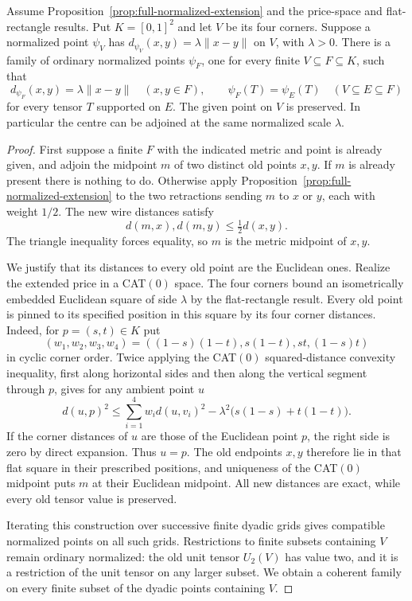 \begin{theorem}
\label{thm:coherent-square-spectrum}
Assume Proposition~\ref{prop:full-normalized-extension} and the price-space and flat-rectangle results.  Put $K=[0,1]^2$ and let $V$ be its four corners.  Suppose a normalized point $\psi_V$ has $d_{\psi_V}(x,y)=\lambda\|x-y\|$ on $V$, with $\lambda>0$.  There is a family of ordinary normalized points $\psi_F$, one for every finite $V\subseteq F\subseteq K$, such that
\[
 d_{\psi_F}(x,y)=\lambda\|x-y\|\quad(x,y\in F),
 \qquad
 \psi_F(T)=\psi_E(T)\quad(V\subseteq E\subseteq F)
\]
for every tensor $T$ supported on $E$.  The given point on $V$ is preserved.  In particular the centre can be adjoined at the same normalized scale $\lambda$.
\end{theorem}
\begin{proof}
First suppose a finite $F$ with the indicated metric and point is already given, and adjoin the midpoint $m$ of two distinct old points $x,y$.  If $m$ is already present there is nothing to do.  Otherwise apply Proposition~\ref{prop:full-normalized-extension} to the two retractions sending $m$ to $x$ or $y$, each with weight $1/2$.  The new wire distances satisfy
\[
 d(m,x),d(m,y)\leq\tfrac12d(x,y).
\]
The triangle inequality forces equality, so $m$ is the metric midpoint of $x,y$.

We justify that its distances to every old point are the Euclidean ones.  Realize the extended price in a CAT$(0)$ space.  The four corners bound an isometrically embedded Euclidean square of side $\lambda$ by the flat-rectangle result.  Every old point is pinned to its specified position in this square by its four corner distances.  Indeed, for $p=(s,t)\in K$ put
\[
 (w_1,w_2,w_3,w_4)=((1-s)(1-t),s(1-t),st,(1-s)t)
\]
in cyclic corner order.  Twice applying the CAT$(0)$ squared-distance convexity inequality, first along horizontal sides and then along the vertical segment through $p$, gives for any ambient point $u$
\[
 d(u,p)^2\leq\sum_{i=1}^4w_i d(u,v_i)^2
                  -\lambda^2\bigl(s(1-s)+t(1-t)\bigr).
\]
If the corner distances of $u$ are those of the Euclidean point $p$, the right side is zero by direct expansion.  Thus $u=p$.  The old endpoints $x,y$ therefore lie in that flat square in their prescribed positions, and uniqueness of the CAT$(0)$ midpoint puts $m$ at their Euclidean midpoint.  All new distances are exact, while every old tensor value is preserved.

Iterating this construction over successive finite dyadic grids gives compatible normalized points on all such grids.  Restrictions to finite subsets containing $V$ remain ordinary normalized: the old unit tensor $U_2(V)$ has value two, and it is a restriction of the unit tensor on any larger subset.  We obtain a coherent family on every finite subset of the dyadic points containing $V$.


\end{proof}
